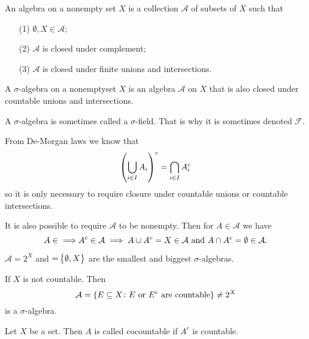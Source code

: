\documentclass[11pt,a4paper]{article}
\begin{document}
\begin{definition}[Algebra]
  An algebra on a nonempty set $X$ is a collection $\mathcal A$ of
  subsets of $X$ such that
  \begin{enumerate}
    \item[(1)] $\emptyset, X \in \mathcal A$;
    \item[(2)] $\mathcal A$ is closed under complement;
    \item[(3)] $\mathcal A$ is closed under finite unions and intersections.
  \end{enumerate}
\end{definition}

\begin{definition}
  A $\sigma$-algebra on a nonemptyset $X$ is an algebra $\mathcal A$ on
  $X$ that is also closed under countable unions and intersections.
\end{definition}

\begin{remark}
  A $\sigma$-algebra is sometimes called a $\sigma$-field.
  That is why it is sometimes denoted $\mathcal F$.
\end{remark}

\begin{remark}
  From De-Morgan laws we know that
  \[
    \del{\bigcup_{i \in I} A_i}^c =
    \bigcap_{i \in I} A_i^c
  \]
  so it is only necessary to require closure under countable unions
  or countable intersections.
\end{remark}

\begin{remark}
  It is also possible to require $\mathcal A$ to be nonempty.
  Then for $A \in \mathcal A$ we have
  \[
    A \in \mathcal \implies A^c \in \mathcal A \implies
    A \cup A^c = X \in \mathcal A \text{ and }
    A \cap A^c = \emptyset \in \mathcal A.
  \]
\end{remark}

\begin{example}
  $\mathcal A = 2^X$ and $\mathcal = \set{\emptyset, X}$ are the smallest
  and biggest $\sigma$-algebras.
\end{example}

\begin{example}
  If $X$ is not countable.
  Then
  \[
    \mathcal A =
    \set{E \subseteq X \colon E \text{ or }E^c \text{ are countable}} \neq
    2^X
  \]
  is a $\sigma$-algebra.
\end{example}

\begin{definition}[Cocountablility]
  Let $X$ be a set. Then $A$ is called cocountable if $A^c$ is countable.
\end{definition}
\end{document}
